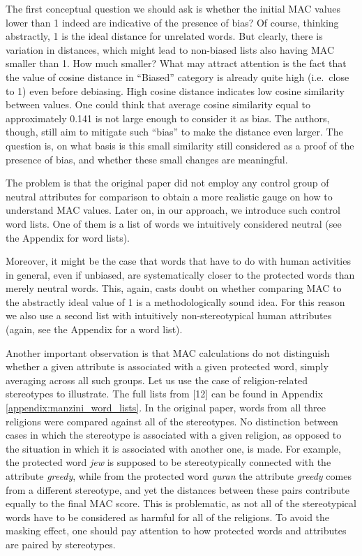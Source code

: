 \documentclass[
  12pt,
  dvipsnames,enabledeprecatedfontcommands]{scrartcl}
\begin{document}
The first conceptual question we should ask is whether the initial
\textsf{MAC} values lower than 1 indeed are indicative of the presence
of bias? Of course, thinking abstractly, 1 is the ideal distance for
unrelated words. But clearly, there is variation in distances, which
might lead to non-biased lists also having \textsf{MAC} smaller than 1.
How much smaller? What may attract attention is the fact that the value
of cosine distance in ``Biased'' category is already quite high
(i.e.~close to 1) even before debiasing. High cosine distance indicates
low cosine similarity between values. One could think that average
cosine similarity equal to approximately 0.141 is not large enough to
consider it as bias. The authors, though, still aim to mitigate such
``bias'' to make the distance even larger. The question is, on what
basis is this small similarity still considered as a proof of the
presence of bias, and whether these small changes are meaningful.

The problem is that the original paper did not employ any control group
of neutral attributes for comparison to obtain a more realistic gauge on
how to understand \textsf{MAC} values. Later on, in our approach, we
introduce such control word lists. One of them is a list of words we
intuitively considered neutral (see the Appendix for word lists).

Moreover, it might be the case that words that have to do with human
activities in general, even if unbiased, are systematically closer to
the protected words than merely neutral words. This, again, casts doubt
on whether comparing \textsf{MAC} to the abstractly ideal value of 1 is
a methodologically sound idea. For this reason we also use a second list
with intuitively non-stereotypical human attributes (again, see the
Appendix for a word list).

Another important observation is that \textsf{MAC} calculations do not
distinguish whether a given attribute is associated with a given
protected word, simply averaging across all such groups. Let us use the
case of religion-related stereotypes to illustrate. The full lists from
{[}12{]} can be found in Appendix \ref{appendix:manzini_word_lists}. In
the original paper, words from all three religions were compared against
all of the stereotypes. No distinction between cases in which the
stereotype is associated with a given religion, as opposed to the
situation in which it is associated with another one, is made. For
example, the protected word \emph{jew} is supposed to be stereotypically
connected with the attribute \emph{greedy}, while from the protected
word \emph{quran} the attribute \emph{greedy} comes from a different
stereotype, and yet the distances between these pairs contribute equally
to the final \textsf{MAC} score. This is problematic, as not all of the
stereotypical words have to be considered as harmful for all of the
religions. To avoid the masking effect, one should pay attention to how
protected words and attributes are paired by stereotypes.
\end{document}
